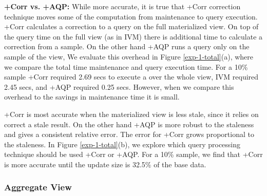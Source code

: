 \textbf{\svcnospace+Corr vs. \svcnospace+AQP: }
While more accurate, it is true that \svcnospace+Corr correction technique moves some of the computation from maintenance to query execution.
\svcnospace+Corr calculates a correction to a query on the full materialized view.
On top of the query time on the full view (as in IVM) there is additional time to calculate a correction from a sample.
On the other hand \svcnospace+AQP runs a query only on the sample of the view, 
We evaluate this overhead in Figure \ref{exp-1-total}(a), where we compare the total time maintenance and query execution time.
For a 10\% sample \svcnospace+Corr required 2.69 secs to execute a \sumfunc over the whole view, IVM required 2.45 secs, and  \svcnospace+AQP required 0.25 secs.
However, when we compare this overhead to the savings in maintenance time it is small.


\svcnospace+Corr is most accurate when the materialized view is less stale, since it relies on correct a stale result.
On the other hand \svcnospace+AQP is more robust to the staleness and gives a consistent relative error.
The error for \svcnospace+Corr grows proportional to the staleness.
In Figure \ref{exp-1-total}(b), we explore which query processing technique should be used \svcnospace+Corr or \svcnospace+AQP.
For a 10\% sample, we find that \svcnospace+Corr is more accurate until the update size is 32.5\% of the base data.




\subsubsection{Aggregate View}
\label{exp-datacube}

